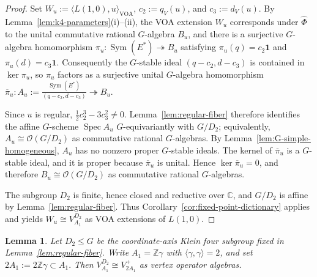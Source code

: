 \documentclass[12pt,leqno]{amsart}
\numberwithin{equation}{section} \newtheorem{thm}{Theorem}[section] \newtheorem{lem}[thm]{Lemma} \newtheorem{ex}[thm]{Example} \newtheorem{prop}[thm]{Proposition} \newtheorem{cor}[thm]{Corollary} \newtheorem{defi}[thm]{Definition} \newtheorem{rmk}[thm]{Remark} \newtheorem{notation}[thm]{Notation}
\newcommand{\one}{\mathbf{1}}
\newcommand{\Sym}{\operatorname{Sym}}
\newcommand{\Spec}{\operatorname{Spec}}
\newcommand{\OO}{\mathcal O}
\def\Z{\mathbb{Z}} \def\N{\mathbb{N}} \def\A{\mathbb{A}} \def\C{\mathbb{C}} \def\R{\mathbb{R}} \def\Q{\mathbb{Q}} \def\F{\mathbb{F}}
\begin{document}
\begin{proof}
Set \(W_u:=\langle L(1,0),u\rangle_{\mathrm{VOA}}\), \(c_2:=q_V(u)\), and \(c_3:=d_V(u)\). By Lemma~\ref{lem:k4-parameters}\textnormal{(i)--(ii)}, the VOA extension $W_u$ corresponds under $\widehat\Phi$ to the unital commutative rational $G$-algebra $B_u$, and there is a surjective $G$-algebra homomorphism \(\pi_u:\Sym(E^*)\twoheadrightarrow B_u\) satisfying \(\pi_u(q)=c_2\one\) and \(\pi_u(d)=c_3\one\). Consequently the $G$-stable ideal \((q-c_2,d-c_3)\) is contained in $\ker\pi_u$, so $\pi_u$ factors as a surjective unital $G$-algebra homomorphism \(\overline\pi_u: A_u:=\frac{\Sym(E^*)}{(q-c_2,d-c_3)}\twoheadrightarrow B_u.\)

Since $u$ is regular, \(\frac12c_2^3-3c_3^2\ne0\). Lemma~\ref{lem:regular-fiber} therefore identifies the affine $G$-scheme $\Spec A_u$ $G$-equivariantly with $G/D_2$; equivalently, \(A_u\cong\OO(G/D_2)\) as commutative rational $G$-algebras. By Lemma~\ref{lem:G-simple-homogeneous}, $A_u$ has no nonzero proper $G$-stable ideals. The kernel of $\overline\pi_u$ is a $G$-stable ideal, and it is proper because $\overline\pi_u$ is unital. Hence \(\ker\overline\pi_u=0\), and therefore \(B_u\cong\OO(G/D_2)\) as commutative rational $G$-algebras.

The subgroup $D_2$ is finite, hence closed and reductive over $\C$, and $G/D_2$ is affine by Lemma~\ref{lem:regular-fiber}. Thus Corollary~\ref{cor:fixed-point-dictionary} applies and yields \(W_u\cong V_{A_1}^{D_2}\) as VOA extensions of $L(1,0)$.
\end{proof}

\begin{lem}\label{lem:D2-lattice}
Let $D_2\le G$ be the coordinate-axis Klein four subgroup fixed in Lemma~\ref{lem:regular-fiber}. Write $A_1=\Z\gamma$ with $\langle\gamma,\gamma\rangle=2$, and set \(2A_1:=2\Z\gamma\subset A_1.\) Then \(V_{A_1}^{D_2}\cong V_{2A_1}^+\) as vertex operator algebras.
\end{lem}
\end{document}
